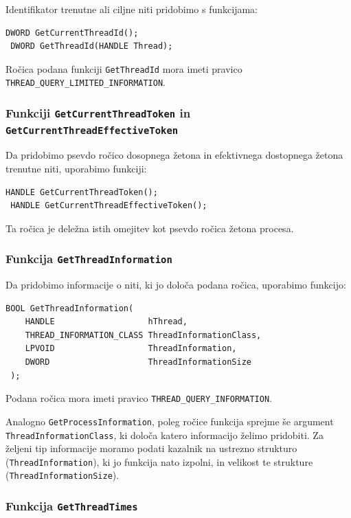 \documentclass[a4paper,12pt,openright]{book}
\begin{document}
Identifikator trenutne ali ciljne niti pridobimo s funkcijama:
\begin{lstlisting}[style=func]
 DWORD GetCurrentThreadId();
 DWORD GetThreadId(HANDLE Thread);
\end{lstlisting}

Ročica podana funkciji \texttt{GetThreadId} mora imeti pravico \texttt{THREAD\_QUERY\-\_LIMITED\-\_INFORMATION}.

\subsubsection{Funkciji \texttt{GetCurrentThreadToken} in \texttt{GetCurrentThreadEffectiveToken}}

Da pridobimo psevdo ročico dosopnega žetona in efektivnega dostopnega žetona trenutne niti, uporabimo funkciji:
\begin{lstlisting}[style=func]
 HANDLE GetCurrentThreadToken();
 HANDLE GetCurrentThreadEffectiveToken();
\end{lstlisting}

Ta ročica je deležna istih omejitev kot psevdo ročica žetona procesa.

\subsubsection{Funkcija \texttt{GetThreadInformation}}

Da pridobimo informacije o niti, ki jo določa podana ročica, uporabimo funkcijo:
\begin{lstlisting}[style=func]
 BOOL GetThreadInformation(
	HANDLE                   hThread,
	THREAD_INFORMATION_CLASS ThreadInformationClass,
	LPVOID                   ThreadInformation,
	DWORD                    ThreadInformationSize
 );
\end{lstlisting}

Podana ročica mora imeti pravico \texttt{THREAD\-\_QUERY\_INFORMATION}.

Analogno \texttt{GetProcessInformation}, poleg ročice funkcija sprejme še argument \texttt{ThreadInformationClass}, ki določa katero informacijo želimo pridobiti.
Za željeni tip informacije moramo podati kazalnik na ustrezno strukturo (\texttt{ThreadInformation}), ki jo funkcija nato izpolni, in velikost te strukture (\texttt{ThreadInformationSize}).

\subsubsection{Funkcija \texttt{GetThreadTimes}}
\end{document}

